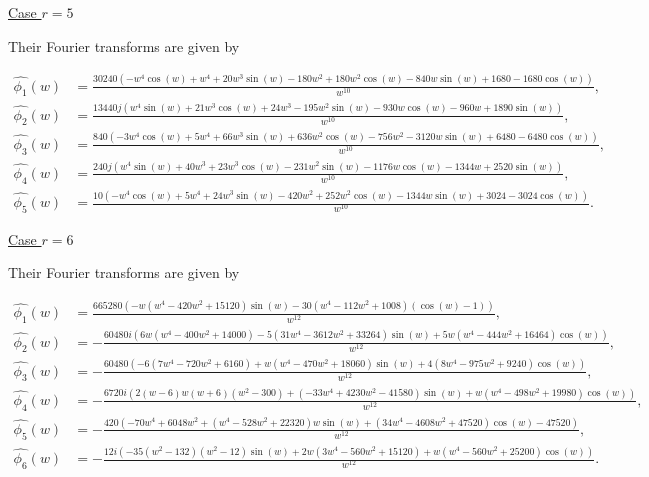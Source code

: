 \documentclass[a4paper, 11pt]{article}
\begin{document}
\underline{Case $r=5$}

Their Fourier transforms are given by

\begin{align*}
  \hat{\phi_1}(w)&=\frac{30240 \left(-w^4 \cos(w) + w^4 + 20w^3 \sin(w) - 180w^2 + 180w^2 \cos(w) - 840 w\sin(w) + 1680 
  - 1680 \cos(w) \right)}{w^{10}}, \\
  \hat{\phi_2}(w)&=\frac{13440 j \left(w^4\sin(w) + 21w^3\cos(w) + 24w^3 - 195w^2\sin(w) - 930w\cos(w) - 960w + 
  1890\sin(w)\right)}{w^{10}}, \\
  \hat{\phi_3}(w)&=\frac{840 \left(-3w^4\cos(w) + 5w^4 + 66w^3\sin(w) + 636w^2\cos(w) - 756w^2 - 3120w\sin(w) + 6480 - 
  6480\cos(w)\right)}{w^{10}}, \\
  \hat{\phi_4}(w)&=\frac{240 j \left(w^4 \sin(w) + 40w^3 + 23w^3\cos(w) -231w^2\sin(w) - 1176w\cos(w) - 1344w + 
  2520\sin(w)\right)}{w^{10}}, \\
  \hat{\phi_5}(w)&=\frac{10 \left(-w^4\cos(w) + 5w^4 + 24w^3\sin(w) -420w^2 + 252w^2\cos(w) - 1344w\sin(w) + 3024 - 
  3024\cos(w) \right)}{w^{10}}.
\end{align*}

\underline{Case $r=6$}

Their Fourier transforms are given by 

\begin{align*}
  \hat{\phi_1}(w)&=\frac{665280 \left(-w \left(w^4-420 w^2+15120\right) \sin (w)-30 \left(w^4-112 w^2+1008\right) (\cos
  (w)-1)\right)}{w^{12}},\\
    \hat{\phi_2}(w)&=-\frac{60480 i \left(6 w \left(w^4-400 w^2+14000\right)-5 \left(31 w^4-3612 w^2+33264\right) \sin 
    (w)+5 w \left(w^4-444 w^2+16464\right) \cos (w)\right)}{w^{12}}, \\
    \hat{\phi_3}(w)&=-\frac{60480 \left(-6 \left(7 w^4-720 w^2+6160\right)+w \left(w^4-470 w^2+18060\right) \sin (w)+4 
    \left(8 w^4-975w^2+9240\right) \cos (w)\right)}{w^{12}}, \\
    \hat{\phi_4}(w)&=-\frac{6720 i \left(2 (w-6) w (w+6) \left(w^2-300\right)+\left(-33 w^4+4230 w^2-41580\right) \sin 
    (w)+w \left(w^4-498w^2+19980\right) \cos (w)\right)}{w^{12}}, \\
    \hat{\phi_5}(w)&=-\frac{420 \left(-70 w^4+6048 w^2+\left(w^4-528 w^2+22320\right) w \sin (w)+\left(34 w^4-4608 
    w^2+47520\right) \cos(w)-47520\right)}{w^{12}}, \\
    \hat{\phi_6}(w)&=-\frac{12 i \left(-35 \left(w^2-132\right) \left(w^2-12\right) \sin (w)+2 w \left(3 w^4-560 
    w^2+15120\right)+w\left(w^4-560 w^2+25200\right) \cos (w)\right)}{w^{12}}.
\end{align*}
\end{document}
